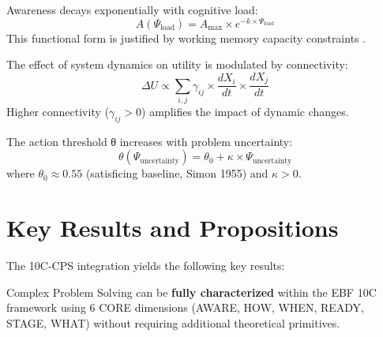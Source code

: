 \begin{tcolorbox}[colback=red!5!white, colframe=red!75!black,
    title=Axiom CPS-3: Awareness-Load Decay]
Awareness decays exponentially with cognitive load:
\begin{equation}
A(\Psi_{\text{load}}) = A_{\max} \times e^{-k \times \Psi_{\text{load}}}
\end{equation}
This functional form is justified by working memory capacity constraints \citep{PAP-sweller1988cognitiveload}.
\end{tcolorbox}

\begin{tcolorbox}[colback=red!5!white, colframe=red!75!black,
    title=Axiom CPS-4: Connectivity Interaction]
The effect of system dynamics on utility is modulated by connectivity:
\begin{equation}
\Delta U \propto \sum_{i,j} \gamma_{ij} \times \frac{dX_i}{dt} \times \frac{dX_j}{dt}
\end{equation}
Higher connectivity ($\gamma_{ij} > 0$) amplifies the impact of dynamic changes.
\end{tcolorbox}

\begin{tcolorbox}[colback=red!5!white, colframe=red!75!black,
    title=Axiom CPS-5: Threshold Elevation Under Uncertainty]
The action threshold θ increases with problem uncertainty:
\begin{equation}
\theta(\Psi_{\text{uncertainty}}) = \theta_0 + \kappa \times \Psi_{\text{uncertainty}}
\end{equation}
where $\theta_0 \approx 0.55$ (satisficing baseline, Simon 1955) and $\kappa > 0$.
\end{tcolorbox}



\section{Key Results and Propositions}
\label{sec:cps-results}

The 10C-CPS integration yields the following key results:

\begin{tcolorbox}[colback=blue!5!white, colframe=blue!75!black,
    title=Proposition CPS-R1: Configuration Sufficiency]
Complex Problem Solving can be \textbf{fully characterized} within the EBF 10C framework using 6 CORE dimensions (AWARE, HOW, WHEN, READY, STAGE, WHAT) without requiring additional theoretical primitives.
\end{tcolorbox}

